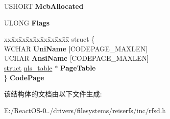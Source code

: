 \begin{DoxyCompactItemize}
\item 
\mbox{\label{struct___r_f_s_d___g_l_o_b_a_l_afe5e71fadfba7dfd12363e76a3beb41d}} 
U\+S\+H\+O\+RT {\bfseries Mcb\+Allocated}
\item 
\mbox{\label{struct___r_f_s_d___g_l_o_b_a_l_a8919a376cefe862199230aaca19a71af}} 
U\+L\+O\+NG {\bfseries Flags}
\item 
\mbox{\label{struct___r_f_s_d___g_l_o_b_a_l_a48cdb46d9130e45c8b126453159f2b43}} 
\begin{tabbing}
xx\=xx\=xx\=xx\=xx\=xx\=xx\=xx\=xx\=\kill
struct \{\\
\>WCHAR {\bfseries UniName} \mbox{[}CODEPAGE\_MAXLEN\mbox{]}\\
\>UCHAR {\bfseries AnsiName} \mbox{[}CODEPAGE\_MAXLEN\mbox{]}\\
\>\hyperlink{interfacestruct}{struct} \hyperlink{structnls__table}{nls\_table} $\ast$ {\bfseries PageTable}\\
\} {\bfseries CodePage}\\

\end{tabbing}\end{DoxyCompactItemize}


该结构体的文档由以下文件生成\+:\begin{DoxyCompactItemize}
\item 
E\+:/\+React\+O\+S-\/0../drivers/filesystems/reiserfs/inc/rfsd.\+h\end{DoxyCompactItemize}
